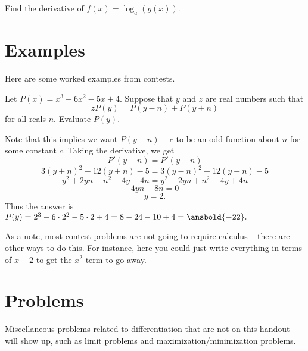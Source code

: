 \documentclass[blue,onecol]{shooting}
\begin{document}
\begin{exer}
Find the derivative of $f(x)=\log_a(g(x)).$
\end{exer}

\section{Examples}

Here are some worked examples from contests.

\begin{exam}[CHMMC 2021/4]
Let $P(x)=x^3-6x^2-5x+4.$ Suppose that $y$ and $z$ are real numbers such that
\[zP(y)=P(y-n)+P(y+n)\]
for all reals $n.$ Evaluate $P(y).$
\end{exam}

\begin{sol}
Note that this implies we want $P(y+n)-c$ to be an odd function about $n$ for some constant $c.$ Taking the derivative, we get
\[P'(y+n)=P'(y-n)\]
\[3(y+n)^2-12(y+n)-5=3(y-n)^2-12(y-n)-5\]
\[y^2+2yn+n^2-4y-4n=y^2-2yn+n^2-4y+4n\]
\[4yn-8n=0\]
\[y=2.\]
Thus the answer is $P(y)=2^3-6\cdot 2^2-5\cdot 2+4=8-24-10+4=\ansbold{-22}.$
\end{sol}

As a note, most contest problems are not going to require calculus -- there are other ways to do this. For instance, here you could just write everything in terms of $x-2$ to get the $x^2$ term to go away.

\pagebreak

\section{Problems}

Miscellaneous problems related to differentiation that are not on this handout will show up, such as limit problems and maximization/minimization problems.
\\

\noindent{}




\end{document}
